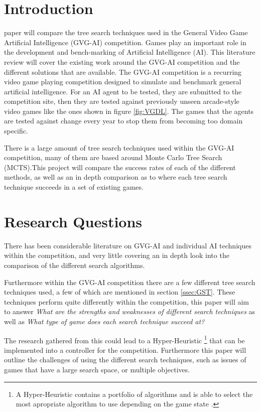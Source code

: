 \documentclass[journal]{IEEEtran}
\begin{document}
\section{Introduction}
	 paper will compare the tree search techniques used in the General Video Game Artificial Intelligence (GVG-AI) competition.  
	Games play an important role in the development and bench-marking of Artificial Intelligence (AI). This literature review will cover the existing work around the GVG-AI competition and the different solutions that are available.
	The GVG-AI competition is a recurring video game playing competition designed to simulate and benchmark general artificial intelligence. For an AI agent to be tested, they are submitted to the competition site, then they are tested against previously unseen arcade-style video games like the ones shown in figure \ref{fig:VGDL}. The games that the agents are tested against change every year to stop them from becoming too domain specific.

	There is a large amount of tree search techniques used within the GVG-AI competition, many of them are based around Monte Carlo Tree Search (MCTS).This project will compare the success rates of each of the different methods, as well as an in depth comparison as to where each tree search technique succeeds in a set of existing games.


\section{Research Questions}

	There has been considerable literature on GVG-AI and individual AI techniques within the competition, and very little covering an in depth look into the comparison of the different search algorithms.

	Furthermore within the GVG-AI competition there are a few different tree search techniques used, a few of which are mentioned in section \ref{ssec:GST}. 
	These techniques perform quite differently within the competition, this paper will aim to answer \textit{What are the strengths and weaknesses of different search techniques} as well as \textit{What type of game does each search technique succeed at?}
	
	The research gathered from this could lead to a Hyper-Heuristic \footnote{A Hyper-Heuristic contains a portfolio of algorithms and is able to select the most apropriate algorithm to use depending on the game state \cite{hyperHeurisicMendes, horn2016mcts}.}  that can be implemented into a controller for the competition. 
	Furthermore this paper will outline the challenges of using the different search techniques, such as issues of games that have a large search space, or multiple objectives.
	
\end{document}
